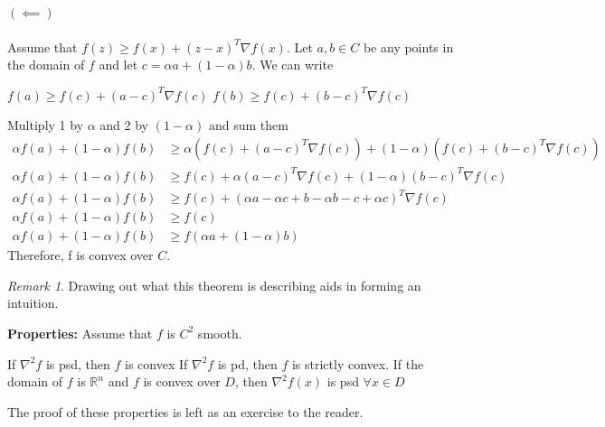 \documentclass[titlepage]{article}
\theoremstyle{plain}
\theoremstyle{definition}
\theoremstyle{remark}
\newtheorem*{rem}{Remark}
\begin{document}
$(\impliedby)$\\\\
Assume that $f(z) \geq f(x) + (z - x)^T \nabla f(x)$. Let $a,b \in C$ be any
points in the domain of $f$ and let $c = \alpha a + (1 - \alpha) b$. We can
write
\begin{outline}[enumerate]
\1 $f(a) \geq f(c) + (a - c)^T \nabla f(c)$
\1 $f(b) \geq f(c) + (b - c)^T \nabla f(c)$
\end{outline}
Multiply 1 by $\alpha$ and 2 by $(1 - \alpha)$ and sum them
\begin{align*}
\alpha f(a) + (1 - \alpha) f(b) &\geq \alpha (f(c) + (a - c)^T \nabla f(c)) + (1 -
\alpha) (f(c) + (b - c)^T \nabla f(c))\\
\alpha f(a) + (1 - \alpha) f(b) &\geq f(c) + \alpha (a - c)^T \nabla f(c) + (1 -
\alpha) (b - c)^T \nabla f(c)\\
\alpha f(a) + (1 - \alpha) f(b) &\geq f(c) + (\alpha a - \alpha c + b - \alpha b
- c + \alpha c)^T \nabla f(c)\\
\alpha f(a) + (1 - \alpha) f(b) &\geq f(c)\\
\alpha f(a) + (1 - \alpha) f(b) &\geq f(\alpha a + (1 - \alpha) b)
\end{align*}
Therefore, f is convex over $C$.\\
\begin{rem} Drawing out what this theorem is describing aids in forming an
intuition.
\end{rem}
\noindent \textbf{Properties: } Assume that $f$ is $C^2$ smooth.
\begin{outline}[enumerate]
\1 If $\nabla^2 f$ is psd, then $f$ is convex
\1 If $\nabla^2 f$ is pd, then $f$ is strictly convex.
\1 If the domain of $f$ is $\mathbb{R}^n$ and $f$ is convex over $D$, then
$\nabla^2 f(x)$ is psd $\forall x \in D$
\end{outline}
The proof of these properties is left as an exercise to the reader.
\end{document}
